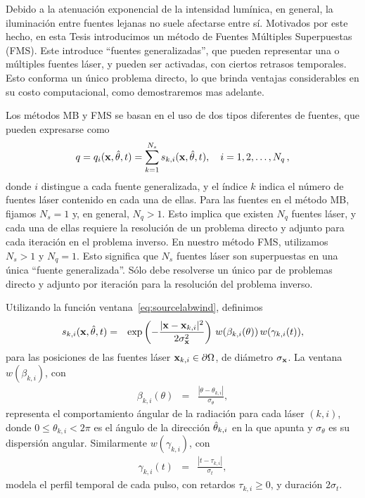  Debido a la atenuación exponencial de la intensidad lumínica, 
en general, la iluminación entre fuentes lejanas no suele afectarse entre sí. 
Motivados por este hecho, en esta Tesis introducimos un método de Fuentes Múltiples 
Superpuestas (FMS). Este introduce ``fuentes generalizadas'', 
que pueden representar una o múltiples fuentes láser, y
pueden ser activadas, con ciertos retrasos temporales. 
Esto conforma un único problema directo, lo que brinda ventajas considerables en su costo computacional, como 
demostraremos mas adelante. 

Los métodos MB y FMS se basan en el uso de dos tipos diferentes de fuentes, que pueden expresarse como
\begin{equation}
  q = q_i(\mathbf{x},\hat{\theta},t) =\sum_{k=1}^{N_s} s_{k,i}(\mathbf{x},\hat{\theta},t) ,\quad i=1,2,\ldots,N_q \, ,
\label{eq:RTEsources}
\end{equation} 
donde $i$ distingue a cada fuente generalizada, y el índice $k$ indica el número de fuentes láser contenido en cada una de ellas. 
Para las fuentes en el método MB, fijamos $N_s=1$ y, en general, $N_q>1$. Esto implica 
que existen $N_q$ fuentes láser, y cada una de ellas requiere la resolución de un problema directo y adjunto para cada iteración en el problema inverso.  
En nuestro método FMS, utilizamos $N_s>1$ y $N_q=1$. Esto 
significa que $N_s$ fuentes láser son superpuestas en una única ``fuente generalizada''. Sólo 
debe resolverse un único par de problemas directo y 
adjunto por iteración para la resolución del problema inverso.

Utilizando la 
función ventana~\eqref{eq:sourcelabwind}, definimos
\begin{eqnarray}
  s_{k,i}(\x,\hth,t) & = & \exp \left(-\frac{|\x-\x_{k,i}|^2}{
  2\sigma_\x^2}\right)\,w(\beta_{k,i}(\theta))\,w(\gamma_{k,i}(t)), %
\label{eq:RTEsources2}
\end{eqnarray}
para las posiciones de las fuentes láser $\mathbf{x}_{k,i}\in\partial\Omega$, de diámetro $\sigma_{\mathbf{x}}$. La ventana $w(\beta_{k,i})$, 
con
\begin{eqnarray}
  \beta_{k,i}(\theta)& = & \frac{|\theta-\theta_{k,i}|}{\sigma_{\theta}},
\label{eq:RTEsources2beta}
\end{eqnarray}
 representa el comportamiento ángular de la radiación para cada láser $(k,i)$, donde $0\leq \theta_{k,i} < 2\pi$  
es el ángulo de la dirección $\hat{\theta}_{k,i}$ en la que apunta 
y $\sigma_{\theta}$ es su dispersión angular. 
Similarmente $w(\gamma_{k,i})$, con 
\begin{eqnarray}
\gamma_{k,i}(t) & = & \frac{|t-\tau_{k,i}|}{\sigma_t} ,
\label{eq:RTEsources2gamma}
\end{eqnarray}
modela el perfil temporal de 
cada pulso, con retardos $\tau_{k,i}\geq 0$, 
y duración $2\sigma_t$. 

